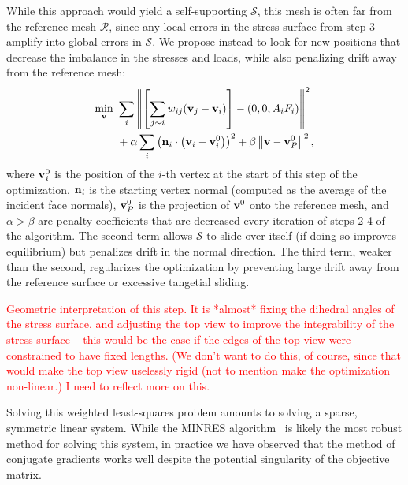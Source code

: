 \documentclass[annual]{acmsiggraph}
\def\SS{{\mathcal S}}
\def\RR{{\mathcal R}}
\newcommand{\todo}[1]{\textcolor{red}{#1}}
\begin{document}
While this approach would yield a self-supporting $\SS$, this mesh is often far from the reference mesh $\RR$, since any local errors in the stress surface from step 3 amplify into global errors in $\SS$. We propose instead to look for new positions that decrease the imbalance in the stresses and loads, while also penalizing drift away from the reference mesh:
\begin{align*}
\min_{{\mathbf v}}\ &\sum_i \left\| \left[\sum_{j\sim i} w_{ij} ({\mathbf v}_j - {\mathbf v}_i)\right] - (0,0,A_iF_i) \right\|^2 \\
&+ \alpha \sum_i \left({\mathbf n}_i \cdot \left({\mathbf v}_i - {\mathbf v}^0_i\right) \right)^2 + \beta \left\|{\mathbf v} - {\mathbf v}^0_P\right\|^2,
\end{align*}
where ${\mathbf v}^0_i$ is the position of the $i$-th vertex at the start of this step of the optimization, ${\mathbf n}_i$ is the starting vertex normal (computed as the average of the incident face normals), ${\mathbf v}^0_P$ is the projection of ${\mathbf v}^0$ onto the reference mesh, and $\alpha > \beta$ are penalty coefficients that are decreased every iteration of steps 2-4 of the algorithm. The second term allows $\SS$ to slide over itself (if doing so improves equilibrium) but penalizes drift in the normal direction. The third term, weaker than the second, regularizes the optimization by preventing large drift away from the reference surface or excessive tangetial sliding.

\todo{Geometric interpretation of this step. It is *almost* fixing the dihedral angles of the stress surface, and adjusting the top view to improve the integrability of the stress surface -- this would be the case if the edges of the top view were constrained to have fixed lengths. (We don't want to do this, of course, since that would make the top view uselessly rigid (not to mention make the optimization non-linear.) I need to reflect more on this.}

Solving this weighted least-squares problem amounts to solving a sparse, symmetric linear system. While the MINRES algorithm~\cite{TODO} is likely the most robust method for solving this system, in practice we have observed that the method of conjugate gradients works well despite the potential singularity of the objective matrix.
\end{document}
